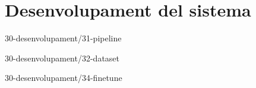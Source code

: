 \chapter{Desenvolupament del sistema}

{30-desenvolupament/31-pipeline}

{30-desenvolupament/32-dataset}


{30-desenvolupament/34-finetune}






\begin{comment}
3 Desenvolupament del sistema
    3.1 Arquitectura del sistema (pipeline)
    3.2 Creació dataset sintètic
    [?] 3.3 Creació de tests
    3.4 Finetune sintètic
    3.5 Dataset i finetune amb dades reals
        3.5.1 Estadístiques descriptives
        3.5.2 Tendències i patrons
        3.5.3 Problemes i incidències comunes
        3.5.4 Anomalies i valors atípics
    3.6 Desplegament API
\end{comment}
